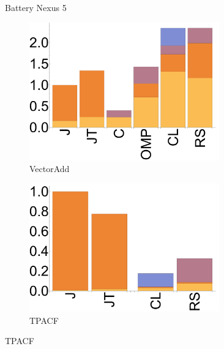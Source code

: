 \begin{figure}[ht]
  \caption{Battery Nexus 5}
\end{figure}


\begin{figure}[ht]
  \begin{subfigure}[b]{0.3\textwidth}
      \includegraphics[width=0.9\textwidth]{data/bbattery_vectoradd_nexus7.pdf}
      \caption{VectorAdd}\label{fig:vectoradd}
  \end{subfigure}

  \begin{subfigure}[b]{0.3\textwidth}
      \includegraphics[width=0.9\textwidth]{data/bbattery_tpacf_nexus7.pdf}
      \caption{TPACF} \label{fig:TPACF}
  \end{subfigure}


\end{figure}
